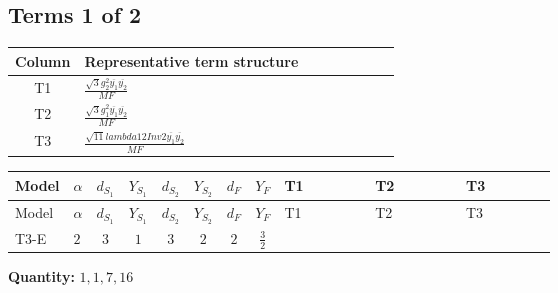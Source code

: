 \documentclass[8pt]{article}
\begin{document}
\begin{landscape}
\subsection*{Terms 1 of 2}
\begin{center}
\begin{tabular}{@{}c >{\raggedright\arraybackslash}p{0.82\linewidth}@{}}
\toprule
Column & Representative term structure \\
\midrule
T1 & \(\displaystyle \frac{\sqrt{3} g_{2}^{2} \overline{y_{1}} \overline{y_{2}}}{MF}\) \\
\midrule
T2 & \(\displaystyle \frac{\sqrt{3} g_{1}^{2} \overline{y_{1}} \overline{y_{2}}}{MF}\) \\
\midrule
T3 & \(\displaystyle \frac{\sqrt{11} lambda12Inv2 \overline{y_{1}} \overline{y_{2}}}{MF}\) \\
\midrule
\bottomrule
\end{tabular}
\end{center}
\smallskip
\tiny
\begin{longtable}{@{}llcccccc >{\raggedright\arraybackslash}p{0.21\linewidth} >{\raggedright\arraybackslash}p{0.21\linewidth} >{\raggedright\arraybackslash}p{0.21\linewidth}@{}}
\toprule
Model & $\alpha$ & $d_{S_1}$ & $Y_{S_1}$ & $d_{S_2}$ & $Y_{S_2}$ & $d_F$ & $Y_F$ & T1 & T2 & T3 \\
\midrule
\endfirsthead
\toprule
Model & $\alpha$ & $d_{S_1}$ & $Y_{S_1}$ & $d_{S_2}$ & $Y_{S_2}$ & $d_F$ & $Y_F$ & T1 & T2 & T3 \\
\midrule
\endhead
T3-E & $2$ & $3$ & $1$ & $3$ & $2$ & $2$ & $\frac{3}{2}$ & \scriptsize\adjustbox{max width=\linewidth}{$\begin{gathered} - \frac{11 \sqrt{3} g_{2}^{2} \overline{y_{1}} \overline{y_{2}}}{8 MF}\end{gathered}$} & \scriptsize\adjustbox{max width=\linewidth}{$\begin{gathered} - \frac{9 \sqrt{3} g_{1}^{2} \overline{y_{1}} \overline{y_{2}}}{8 MF}\end{gathered}$} & \scriptsize\adjustbox{max width=\linewidth}{$\begin{gathered} - \frac{3 \sqrt{11} lambda12Inv2 \overline{y_{1}} \overline{y_{2}}}{22 MF}\end{gathered}$} \\
\midrule
\bottomrule
\end{longtable}
\clearpage
\noindent\textbf{Quantity: }$\mathrm{1,1,7,16}$\par\smallskip

\end{landscape}
\end{document}
